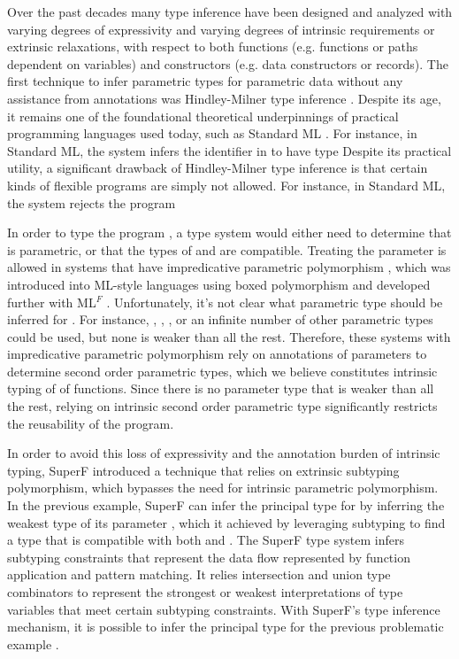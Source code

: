 \documentclass[acmsmall]{acmart}
\theoremstyle{definition}
\begin{document}
Over the past decades many type inference have been designed and analyzed 
with varying degrees of expressivity and varying degrees of intrinsic requirements
or extrinsic relaxations, with respect to both functions (e.g. functions or paths dependent on variables)
and constructors (e.g. data constructors or records).  
The first technique to infer parametric types for parametric
data without any assistance from annotations was Hindley-Milner type inference \cite{}. Despite its age, 
it remains one of the foundational 
theoretical underpinnings of practical programming languages used today, such as Standard ML \cite{}. 
For instance, in Standard ML, the system infers the identifier  in 
to have type 
Despite its practical utility, a significant drawback of Hindley-Milner type inference is that
certain kinds of flexible programs are simply not allowed.
For instance, in Standard ML, the system rejects the program 

In order to type the program , a type system would either need to determine that
 is parametric, or that the types of  and  are compatible.
Treating the parameter  is allowed in systems that have impredicative parametric polymorphism \cite{}, which
was introduced into ML-style languages using boxed polymorphism \cite{} and developed further with ML$^F$ \cite{}. 
Unfortunately, it's not clear what parametric type should be inferred for .
For instance, , , , 
or an infinite number of
other parametric types could be used, but none is weaker than all the rest.
Therefore, these systems with impredicative parametric polymorphism rely on annotations of parameters to
determine second order parametric types, which we believe constitutes intrinsic typing of
of functions. Since there is no parameter type that is weaker than all the rest,
relying on intrinsic second order parametric type significantly restricts the reusability
of the program.

In order to avoid this loss of expressivity and the annotation burden of intrinsic typing, 
SuperF \cite{} introduced 
a technique that relies on extrinsic subtyping polymorphism, 
which bypasses the need for intrinsic parametric polymorphism.
In the previous example, SuperF can infer the principal type for  by inferring the 
weakest type of its parameter , which it achieved by leveraging subtyping to find 
a type that is compatible with both  and .
The SuperF type system infers subtyping constraints that represent the data flow represented by
function application and pattern matching. It relies 
intersection and union type combinators to represent the strongest or weakest interpretations
of type variables that meet certain subtyping constraints.   
With SuperF's type inference mechanism, it is possible to infer the principal type for the 
previous problematic example .
\end{document}
